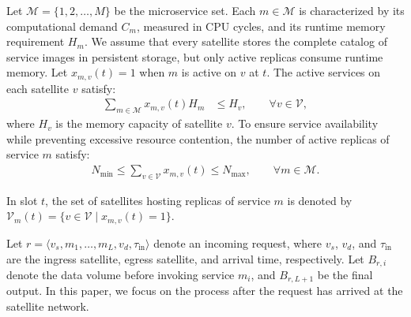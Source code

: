 \documentclass[10pt, conference, letterpaper]{IEEEtran}
\begin{document}
Let $\mathcal{M}= \{ 1, 2, \ldots, M \}$ be the microservice set. Each $m \in \mathcal{M}$ is characterized by its computational demand $C_m$, measured in CPU cycles, and its runtime memory requirement $H_m$. We assume that every satellite stores the complete catalog of service images in persistent storage, but only active replicas consume runtime memory.
Let $x_{m,v}(t)=1$ when $m$ is active on $v$ at $t$. The active services on each satellite $v$ satisfy:
\begin{align}
{\sum}_{m \in \mathcal{ M }}x_{m,v}(t)H_m&\leq H_v,  \qquad \forall v\in\mathcal V,
\label{eq:memory_elara}
\end{align}
where $H_v$ is the memory capacity of satellite $v$. To ensure service availability while preventing excessive resource contention, the number of active replicas of service $m$ satisfy:
\begin{align}
N_{\text{min}} \leq {\sum}_{v \in \mathcal{V}} x_{m,v}(t)  \leq  N_{\text{max}},  \qquad  \forall m \in \mathcal {M}.
\label{eq:replica_count_elara}
\end{align}

In slot $t$, the set of satellites hosting replicas of service $m$ is denoted by $\mathcal{V}_{m}(t)= \{v \in \mathcal{V}  \mid  x_{m,v}(t) = 1\}$.

Let $r=\langle v_s,m_1,\ldots,m_L,v_d,\tau_{\text{in}}\rangle$ denote an incoming request, where $v_s$, $v_d$, and $\tau_{\text{in}}$ are the ingress satellite, egress satellite, and arrival time, respectively.
Let $B_{r,i}$ denote the  data volume before invoking service $m_i$, and $B_{r,L+1}$ be the final output.
In this paper, we focus on the process after the request has arrived at the satellite network.
\end{document}
